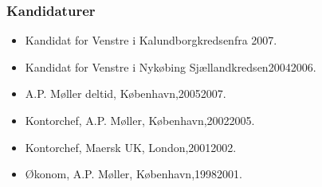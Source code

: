 \documentclass[11pt, a4paper]{awesome-cv}
\begin{document}
\begin{cvletter}
\subsubsection*{Kandidaturer}
\begin{itemize}
\item Kandidat for Venstre i Kalundborgkredsenfra 2007.
\item Kandidat for Venstre i Nykøbing Sjællandkredsen20042006.
\end{itemize}
\begin{itemize}
\item A.P. Møller deltid, København,20052007.
\item Kontorchef, A.P. Møller, København,20022005.
\item Kontorchef, Maersk UK, London,20012002.
\item Økonom, A.P. Møller, København,19982001.
\end{itemize}
\end{cvletter}
\end{document}
